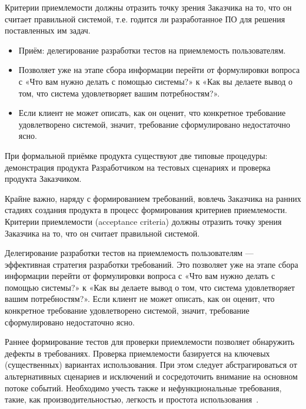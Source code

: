 \documentclass{../industrial-development}
\begin{document}
{\begin{frame}
  \begin{block}{}
\alert{Критерии приемлемости} должны отразить точку зрения Заказчика на то, что он считает правильной системой, т.е. годится ли разработанное ПО для решения поставленных им задач.
	  \end{block}
		\begin{itemize}
\item Приём: делегирование разработки тестов на
приемлемость пользователям. 
\item Позволяет уже на этапе
сбора информации перейти от формулировки вопроса с
\alert{«Что вам нужно делать с помощью системы?»} к \alert{«Как вы
делаете вывод о том, что система удовлетворяет вашим
потребностям?»}.
\item Если клиент не может описать, как он оценит, что конкретное требование удовлетворено системой, значит, требование сформулировано недостаточно ясно.
\end{itemize}
\end{frame}


\lecturenotes

При формальной приёмке продукта существуют две типовые процедуры: демонстрация продукта Разработчиком на тестовых сценариях и проверка продукта Заказчиком.

Крайне важно, наряду с формированием требований, вовлечь Заказчика на ранних стадиях
создания продукта в процесс формирования критериев приемлемости. \alert{Критерии
приемлемости (acceptance criteria)} должны отразить точку зрения Заказчика на то, что он
считает правильной системой.

Делегирование разработки тестов на приемлемость пользователям — эффективная
стратегия разработки требований. Это позволяет уже на этапе сбора информации
перейти от формулировки вопроса с «Что вам нужно делать с помощью системы?» к «Как
вы делаете вывод о том, что система удовлетворяет вашим потребностям?». Если клиент
не может описать, как он оценит, что конкретное требование удовлетворено системой,
значит, требование сформулировано недостаточно ясно.

Раннее формирование тестов для проверки приемлемости позволяет обнаружить
дефекты в требованиях.
Проверка приемлемости базируется на ключевых (существенных) вариантах
использования. При этом следует абстрагироваться от альтернативных сценариев и
исключений и сосредоточить внимание на основном потоке событий. Необходимо учесть
также и нефункциональные требования, такие, как производительностью, легкость и
простота использования~\cite[с.~68]{Maglinec}.


}
\end{document}
